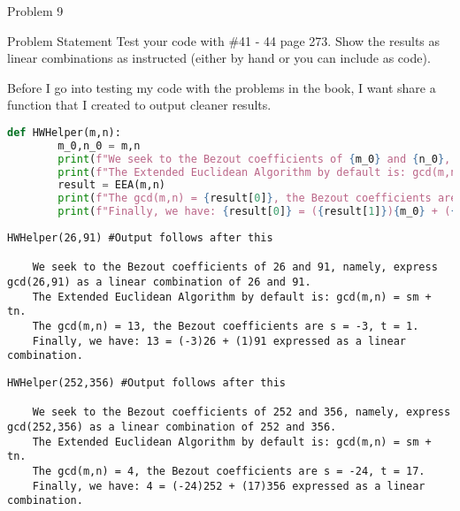 \begin{problem}{Problem 9}
    \begin{statement}{Problem Statement}
        Test your code with \#41 - 44 page 273. Show the results as linear combinations as instructed (either by hand or you can include as code).
    \end{statement}

    \begin{highlight}
        Before I go into testing my code with the problems in the book, I want share a function that I created to output cleaner results.

    \begin{lstlisting}[style=stackoverflow, language=python]
    def HWHelper(m,n):
        m_0,n_0 = m,n
        print(f"We seek to the Bezout coefficients of {m_0} and {n_0}, namely, express gcd({m_0},{n_0}) as a linear combination of {m_0} and {n_0}.")
        print(f"The Extended Euclidean Algorithm by default is: gcd(m,n) = sm + tn.")
        result = EEA(m,n)
        print(f"The gcd(m,n) = {result[0]}, the Bezout coefficients are s = {result[1]}, t = {result[2]}.")
        print(f"Finally, we have: {result[0]} = ({result[1]}){m_0} + ({result[2]}){n_0} expressed as a linear combination.")
    \end{lstlisting}
    \end{highlight}

    \begin{highlight}[Solution - \# 41]
    \begin{lstlisting}[style=stackoverflow]
    HWHelper(26,91) #Output follows after this

    We seek to the Bezout coefficients of 26 and 91, namely, express gcd(26,91) as a linear combination of 26 and 91.
    The Extended Euclidean Algorithm by default is: gcd(m,n) = sm + tn.
    The gcd(m,n) = 13, the Bezout coefficients are s = -3, t = 1.
    Finally, we have: 13 = (-3)26 + (1)91 expressed as a linear combination.
    \end{lstlisting}
    \end{highlight}

    \begin{highlight}[Solution - \# 42]
    \begin{lstlisting}[style=stackoverflow]
    HWHelper(252,356) #Output follows after this

    We seek to the Bezout coefficients of 252 and 356, namely, express gcd(252,356) as a linear combination of 252 and 356.
    The Extended Euclidean Algorithm by default is: gcd(m,n) = sm + tn.
    The gcd(m,n) = 4, the Bezout coefficients are s = -24, t = 17.
    Finally, we have: 4 = (-24)252 + (17)356 expressed as a linear combination.
    \end{lstlisting}
    \end{highlight}


\end{problem}

